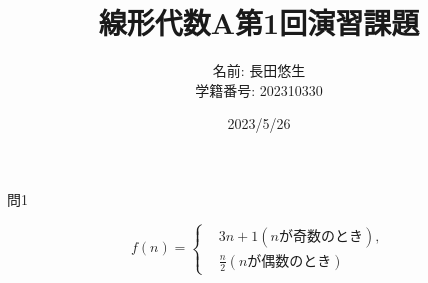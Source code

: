 \documentclass[dvipdfmx,uplatex]{jsarticle}
\title{線形代数A第1回演習課題}
\author{
    名前: 長田悠生\\
    学籍番号: 202310330
    }
\date{2023/5/26}
\begin{document}
  \begin{titlepage}
    \maketitle
    \begin{center}
      \textmc{\HUGE \LaTeX}
    \end{center}
    \thispagestyle{empty}
  \end{titlepage}

  \centerline{\large 問1}
  \vspace{10mm}
  \begin{equation}
    f(n) = 
    \left \{
        \begin{aligned}
            &3n + 1 (nが奇数のとき),\\
            &\frac{n}{2} (nが偶数のとき)
        \end{aligned}
    \right. \nonumber
  \end{equation}
\end{document}
